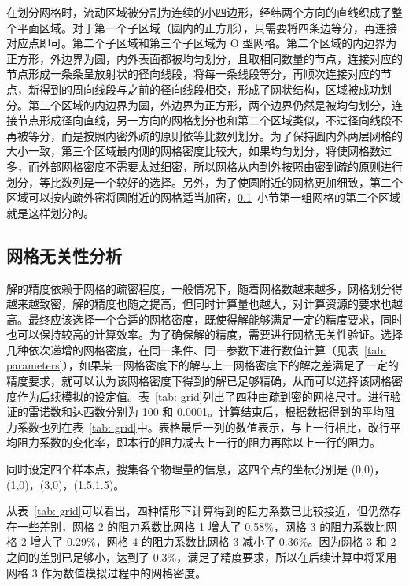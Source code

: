在划分网格时，流动区域被分割为连续的小四边形，经纬两个方向的直线织成了整个平面区域。对于第一个子区域（圆内的正方形），只需要将四条边等分，再连接对应点即可。第二个子区域和第三个子区域为 O 型网格。第二个区域的内边界为正方形，外边界为圆，内外表面都被均匀划分，且取相同数量的节点，连接对应的节点形成一条条呈放射状的径向线段，将每一条线段等分，再顺次连接对应的节点，新得到的周向线段与之前的径向线段相交，形成了网状结构，区域被成功划分。第三个区域的内边界为圆，外边界为正方形，两个边界仍然是被均匀划分，连接节点形成径向直线，另一方向的网格划分也和第二个区域类似，不过径向线段不再被等分，而是按照内密外疏的原则依等比数列划分。为了保持圆内外两层网格的大小一致，第三个区域最内侧的网格密度比较大，如果均匀划分，将使网格数过多，而外部网格密度不需要太过细密，所以网格从内到外按照由密到疏的原则进行划分，等比数列是一个较好的选择。另外，为了使圆附近的网格更加细致，第二个区域可以按内疏外密将圆附近的网格适当加密，\ref{subsec: grid-independent}~小节第一组网格的第二个区域就是这样划分的。

\subsection{网格无关性分析}\label{subsec: grid-independent}

解的精度依赖于网格的疏密程度，一般情况下，随着网格数越来越多，网格划分得越来越致密，解的精度也随之提高，但同时计算量也越大，对计算资源的要求也越高。最终应该选择一个合适的网格密度，既使得解能够满足一定的精度要求，同时也可以保持较高的计算效率。为了确保解的精度，需要进行网格无关性验证。选择几种依次递增的网格密度，在同一条件、同一参数下进行数值计算（见表~\ref{tab: parameters}），如果某一网格密度下的解与上一网格密度下的解之差满足了一定的精度要求，就可以认为该网格密度下得到的解已足够精确，从而可以选择该网格密度作为后续模拟的设定值。表~\ref{tab: grid}列出了四种由疏到密的网格尺寸。进行验证的雷诺数和达西数分别为 100 和 0.0001。计算结束后，根据数据得到的平均阻力系数也列在表~\ref{tab: grid}中。表格最后一列的数值表示，与上一行相比，改行平均阻力系数的变化率，即本行的阻力减去上一行的阻力再除以上一行的阻力。

同时设定四个样本点，搜集各个物理量的信息，这四个点的坐标分别是 (0,0)，(1,0)，(3,0)，(1.5,1.5)。

从表~\ref{tab: grid}可以看出，四种情形下计算得到的阻力系数已比较接近，但仍然存在一些差别，网格 2 的阻力系数比网格 1 增大了 0.58\%，网格 3 的阻力系数比网格 2 增大了 0.29\%，网格 4 的阻力系数比网格 3 减小了 0.36\%。因为网格 3 和 2 之间的差别已足够小，达到了 0.3\%，满足了精度要求，所以在后续计算中将采用网格 3 作为数值模拟过程中的网格密度。

